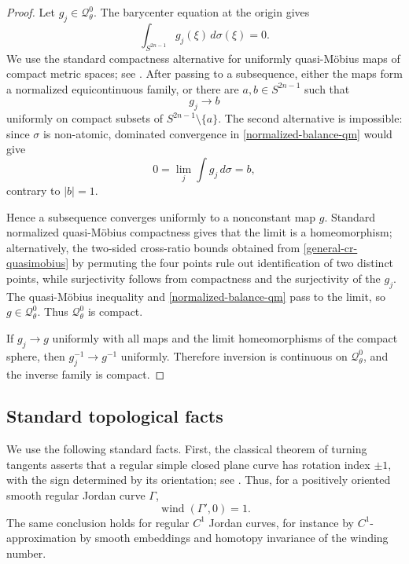\documentclass[11pt]{article}
\theoremstyle{definition}
\theoremstyle{remark}
\theoremstyle{definition}
\newcommand{\wind}{\operatorname{wind}}
\begin{document}
\begin{proof}
Let \(g_j\in\mathcal Q_\theta^0\).  The barycenter equation at the origin gives
\begin{equation}\label{normalized-balance-qm}
        \int_{S^{2n-1}}g_j(\xi)\,d\sigma(\xi)=0.
\end{equation}
We use the standard compactness alternative for uniformly quasi-M\"obius maps
of compact metric spaces; see \cite[Corollary~2.7]{Haissinsky}.  After passing
to a subsequence, either the maps form a normalized equicontinuous family, or
there are \(a,b\in S^{2n-1}\) such that
\[
        g_j\longrightarrow b
\]
uniformly on compact subsets of \(S^{2n-1}\setminus\{a\}\).
The second alternative is impossible: since \(\sigma\) is non-atomic,
dominated convergence in \eqref{normalized-balance-qm} would give
\[
        0=\lim_j\int g_j\,d\sigma=b,
\]
contrary to \(|b|=1\).

Hence a subsequence converges uniformly to a nonconstant map \(g\).  Standard
normalized quasi-M\"obius compactness gives that the limit is a homeomorphism;
alternatively, the two-sided cross-ratio bounds obtained from
\eqref{general-cr-quasimobius} by permuting the four points rule out
identification of two distinct points, while surjectivity follows from compactness
and the surjectivity of the \(g_j\).  The quasi-M\"obius inequality and
\eqref{normalized-balance-qm} pass to the limit, so
\(g\in\mathcal Q_\theta^0\).  Thus \(\mathcal Q_\theta^0\) is compact.

If \(g_j\to g\) uniformly with all maps and the limit homeomorphisms of the
compact sphere, then \(g_j^{-1}\to g^{-1}\) uniformly.  Therefore inversion is
continuous on \(\mathcal Q_\theta^0\), and the inverse family is compact.
\end{proof}


\subsection{Standard topological facts}

We use the following standard facts. First, the classical theorem of turning
tangents asserts that a regular simple closed plane curve has rotation index
\(\pm1\), with the sign determined by its orientation; see
\cite[Sec.~5--7, Theorem~2, p.~396]{doCarmo1976}. Thus, for a positively
oriented smooth regular Jordan curve \(\Gamma\),
\begin{equation}\label{eq:turning-standard}
    \wind(\Gamma',0)=1.
\end{equation}
The same conclusion holds for regular \(C^1\) Jordan curves, for instance by
\(C^1\)-approximation by smooth embeddings and homotopy invariance of the
winding number.
\end{document}
